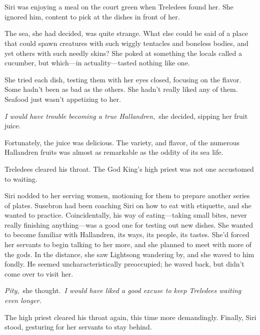 \chapter{}

Siri was enjoying a meal on the court green when Treledees found her. She ignored him, content to pick at the dishes in front of her.

The sea, she had decided, was quite strange. What else could be said of a place that could spawn creatures with such wiggly tentacles and boneless bodies, and yet others with such needly skins? She poked at something the locals called a cucumber, but which—in actuality—tasted nothing like one.

She tried each dish, testing them with her eyes closed, focusing on the flavor. Some hadn’t been as bad as the others. She hadn’t really liked any of them. Seafood just wasn’t appetizing to her.

\textit{I would have trouble becoming a true Hallandren,}~she decided, sipping her fruit juice.

Fortunately, the juice was delicious. The variety, and flavor, of the numerous Hallandren fruits was almost as remarkable as the oddity of its sea life.

Treledees cleared his throat. The God King’s high priest was not one accustomed to waiting.

Siri nodded to her serving women, motioning for them to prepare another series of plates. Susebron had been coaching Siri on how to eat with etiquette, and she wanted to practice. Coincidentally, his way of eating—taking small bites, never really finishing anything—was a good one for testing out new dishes. She wanted to become familiar with Hallandren, its ways, its people, its tastes. She’d forced her servants to begin talking to her more, and she planned to meet with more of the gods. In the distance, she saw Lightsong wandering by, and she waved to him fondly. He seemed uncharacteristically preoccupied; he waved back, but didn’t come over to visit her.

\textit{Pity,}~she thought.~\textit{I would have liked a good excuse to keep Treledees waiting even longer.}

The high priest cleared his throat again, this time more demandingly. Finally, Siri stood, gesturing for her servants to stay behind.

